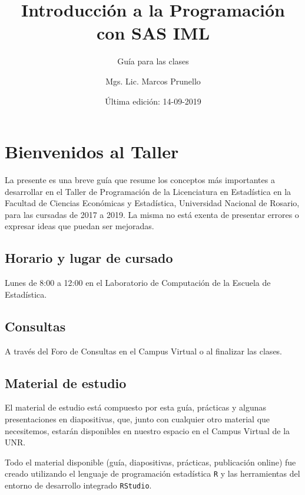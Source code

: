 \documentclass[
]{book}
\title{Introducción a la Programación con SAS IML}
\subtitle{Guía para las clases}
\author{Mgs. Lic. Marcos Prunello}
\date{Última edición: 14-09-2019}
\begin{document}
\maketitle

{
\setcounter{tocdepth}{1}
\tableofcontents
}
\hypertarget{bienvenidos-al-taller}{%
\chapter{Bienvenidos al Taller}\label{bienvenidos-al-taller}}

La presente es una breve guía que resume los conceptos más importantes a desarrollar en el Taller de Programación de la Licenciatura en Estadística en la Facultad de Ciencias Económicas y Estadística, Universidad Nacional de Rosario, para las cursadas de 2017 a 2019. La misma no está exenta de presentar errores o expresar ideas que puedan ser mejoradas.

\hypertarget{horario-y-lugar-de-cursado}{%
\section*{Horario y lugar de cursado}\label{horario-y-lugar-de-cursado}}

Lunes de 8:00 a 12:00 en el Laboratorio de Computación de la Escuela de Estadística.

\hypertarget{consultas}{%
\section*{Consultas}\label{consultas}}

A través del Foro de Consultas en el Campus Virtual o al finalizar las clases.

\hypertarget{material-de-estudio}{%
\section*{Material de estudio}\label{material-de-estudio}}

El material de estudio está compuesto por esta guía, prácticas y algunas presentaciones en diapositivas, que, junto con cualquier otro material que necesitemos, estarán disponibles en nuestro espacio en el Campus Virtual de la UNR.

Todo el material disponible (guía, diapositivas, prácticas, publicación online) fue creado utilizando el lenguaje de programación estadística \texttt{R} y las herramientas del entorno de desarrollo integrado \texttt{RStudio}.
\end{document}

